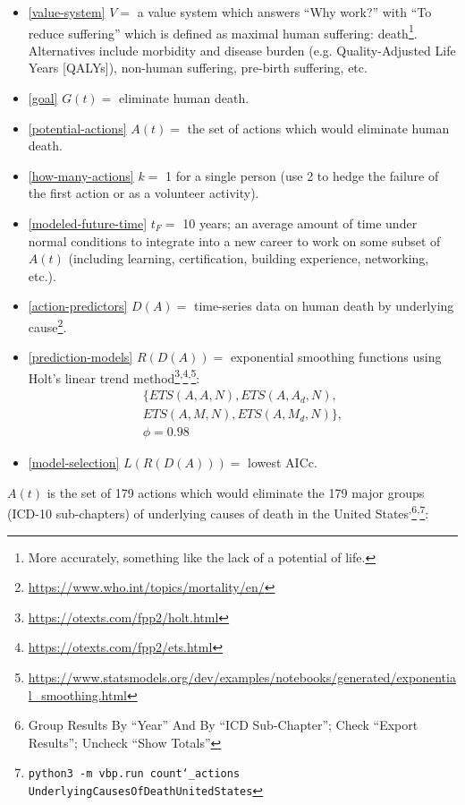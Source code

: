 \documentclass[12pt, a4paper, twocolumn]{article}
\begin{document}
\begin{itemize}
  \item \eqref{value-system} $V = $ a value system which answers \enquote{Why work?} with \enquote{To reduce suffering} which is defined as maximal human suffering: death\footnote{More accurately, something like the lack of a potential of life.}. Alternatives include morbidity and disease burden (e.g. Quality-Adjusted Life Years [QALYs]\cite{weinstein2009qalys}), non-human suffering, pre-birth suffering, etc.
  \item \eqref{goal} $G(t) = $ eliminate human death.
  \item \eqref{potential-actions} $A(t) = $ the set of actions which would eliminate human death.
  \item \eqref{how-many-actions} $k = $ 1 for a single person (use 2 to hedge the failure of the first action or as a volunteer activity).
  \item \eqref{modeled-future-time} $t_F = $ 10 years; an average amount of time under normal conditions to integrate into a new career to work on some subset of $A(t)$ (including learning, certification, building experience, networking, etc.).
  \item \eqref{action-predictors} $D(A) = $ time-series data on human death by underlying cause\footnote{\url{https://www.who.int/topics/mortality/en/}}.
  \item \eqref{prediction-models} $R(D(A)) = $ exponential smoothing functions using Holt's linear trend method\footnote{\url{https://otexts.com/fpp2/holt.html}}\textsuperscript{,}\footnote{\url{https://otexts.com/fpp2/ets.html}}\textsuperscript{,}\footnote{\url{https://www.statsmodels.org/dev/examples/notebooks/generated/exponential_smoothing.html}}:
    \begin{equation*}
      \begin{gathered}
        \{ETS(A,A,N),ETS(A,A_d,N),\\
        ETS(A,M,N),ETS(A,M_d,N)\},\\
        \phi=0.98
      \end{gathered}
    \end{equation*}
  \item \eqref{model-selection} $L(R(D(A))) = $ lowest AICc.
\end{itemize}

$A(t)$ is the set of 179 actions which would eliminate the 179 major groups (ICD-10 sub-chapters\cite{icd10}) of underlying causes of death in the United States\cite{centers2017underlying,censusestimates19001999,worldbankopendata,nbermortality}\textsuperscript{,}\footnote{Group Results By \enquote{Year} And By \enquote{ICD Sub-Chapter}; Check \enquote{Export Results}; Uncheck \enquote{Show Totals}}\textsuperscript{,}\footnote{\texttt{python3 -m vbp.run count\char`_actions UnderlyingCausesOfDeathUnitedStates}}:
\end{document}
